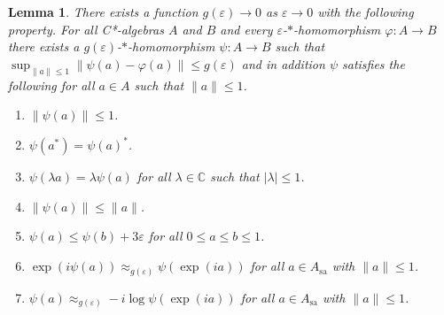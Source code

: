 \documentclass[10pt,a4paper]{amsart}
\newtheorem{lemma}{Lemma}
\newcommand{\bbC}{\mathbb C}
\newcommand{\cstar}{C*}
\begin{document}
\begin{lemma}\label{L.Corrected}
		There exists a function $g(\varepsilon)\to 0$ as $\varepsilon\to 0$ with the following property. For all \cstar-algebras $A$ and $B$ and every $\varepsilon$-$*$-homomorphism $\varphi\colon A\to B$ 
 there exists a $g(\varepsilon)$-$*$-homomorphism $\psi\colon A\to B$ such that $\sup_{\|a\|\leq 1} \|\psi(a)-\varphi(a)\| \leq g(\varepsilon)$ and in addition $\psi$ satisfies the following for all $a\in A$ such that  $\|a\|\leq 1$. 
\begin{enumerate}
	\item\label{a.Corrected.norm} $\|\psi(a)\|\leq 1$. 
	\item \label{a.Corrected.*} $\psi(a^*)=\psi(a)^*$. 
	\item \label{a.Corrected.scalar} $\psi(\lambda a)=\lambda \psi(a)$ for all $\lambda\in \bbC$ such that $|\lambda|\leq 1$. 
	\item \label{a.Corrected.ctns}$\|\psi(a)\|\leq \|a\|$. 
	\item \label{a.Corrected.leq} $\psi(a)\leq \psi(b)+3\varepsilon$ for all $0\leq a\leq b\leq 1$. 
			\item \label{a.Corrected.exp} $\exp(i\psi(a))\approx_{g(\varepsilon )}\psi(\exp(i a))$ for all $a\in A_{\textrm{sa}}$ with $\|a\|\leq 1$. 
	\item \label{a.Corrected.log} $\psi(a)\approx_{g(\varepsilon)} -i \log \psi(\exp(ia))$ for all $a\in A_{\textrm{sa}}$ with $\|a\|\leq 1$.
\end{enumerate}
\end{lemma}
\end{document}
